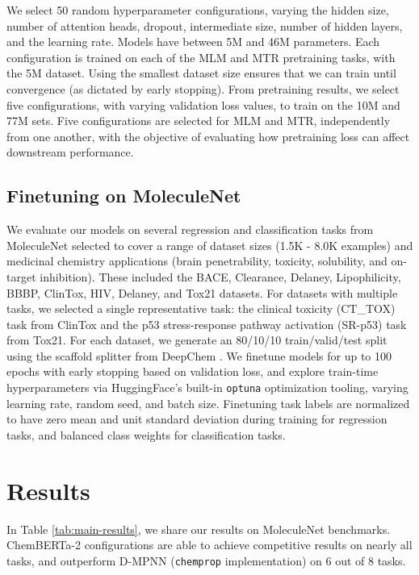 \documentclass{article}
\begin{document}
We select 50 random hyperparameter configurations, varying the hidden size, number of attention heads, dropout, intermediate size, number of hidden layers, and the learning rate. Models have between 5M and 46M parameters. Each configuration is trained on each of the MLM and MTR pretraining tasks, with the 5M dataset. Using the smallest dataset size ensures that we can train until convergence (as dictated by early stopping). From pretraining results, we select five configurations, with varying validation loss values, to train on the 10M and 77M sets. Five configurations are selected for MLM and MTR, independently from one another, with the objective of evaluating how pretraining loss can affect downstream performance. 

\subsection{Finetuning on MoleculeNet}

We evaluate our models on several regression and classification tasks from MoleculeNet \cite{wu2018moleculenet} selected to cover a range of dataset sizes (1.5K - 8.0K examples) and medicinal chemistry applications (brain penetrability, toxicity, solubility, and on-target inhibition). These included the BACE, Clearance, Delaney, Lipophilicity, BBBP, ClinTox, HIV, Delaney, and Tox21 datasets. For datasets with multiple tasks, we selected a single representative task: the clinical toxicity (CT\_TOX) task from ClinTox and the p53 stress-response pathway activation (SR-p53) task from Tox21. For each dataset, we generate an 80/10/10 train/valid/test split using the scaffold splitter from DeepChem \cite{deepchem}. We finetune models for up to 100 epochs with early stopping based on validation loss, and explore train-time hyperparameters via HuggingFace's built-in \texttt{optuna} optimization tooling, varying learning rate, random seed, and batch size. Finetuning task labels are normalized to have zero mean and unit standard deviation during training for regression tasks, and balanced class weights for classification tasks.

\section{Results}
In Table \ref{tab:main-results}, we share our results on MoleculeNet benchmarks. ChemBERTa-2 configurations are able to achieve competitive results on nearly all tasks, and outperform D-MPNN (\texttt{chemprop} implementation) on 6 out of 8 tasks.
\end{document}
